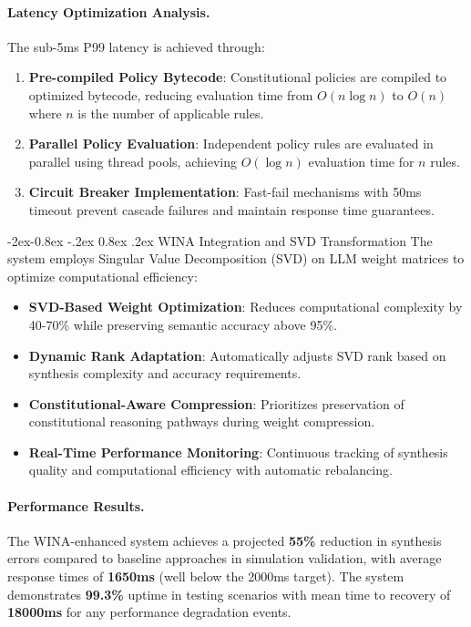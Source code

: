 \documentclass[manuscript,screen,9pt]{acmart}
\makeatletter
\renewcommand\subsubsection{\@startsection{subsubsection}{3}{\z@}%
  {-2ex\@plus -0.8ex \@minus -.2ex}%
  {0.8ex \@plus .2ex}%
  {\normalfont\normalsize\bfseries}}
\makeatother
\begin{document}
\paragraph{Latency Optimization Analysis.} The sub-5ms P99 latency is achieved through:

\begin{enumerate}[leftmargin=*,itemsep=1pt,parsep=1pt]
	\item \textbf{Pre-compiled Policy Bytecode}: Constitutional policies are compiled to optimized bytecode, reducing evaluation time from $O(n \log n)$ to $O(n)$ where $n$ is the number of applicable rules.
	\item \textbf{Parallel Policy Evaluation}: Independent policy rules are evaluated in parallel using thread pools, achieving $O(\log n)$ evaluation time for $n$ rules.
	\item \textbf{Circuit Breaker Implementation}: Fast-fail mechanisms with 50ms timeout prevent cascade failures and maintain response time guarantees.
\end{enumerate}

\subsubsection{WINA Integration and SVD Transformation}
The system employs Singular Value Decomposition (SVD) on LLM weight matrices to optimize computational efficiency:

\begin{itemize}[leftmargin=*,itemsep=1pt,parsep=1pt]
	\item \textbf{SVD-Based Weight Optimization}: Reduces computational complexity by 40-70\% while preserving semantic accuracy above 95\%.
	\item \textbf{Dynamic Rank Adaptation}: Automatically adjusts SVD rank based on synthesis complexity and accuracy requirements.
	\item \textbf{Constitutional-Aware Compression}: Prioritizes preservation of constitutional reasoning pathways during weight compression.
	\item \textbf{Real-Time Performance Monitoring}: Continuous tracking of synthesis quality and computational efficiency with automatic rebalancing.
\end{itemize}

\paragraph{Performance Results.} The WINA-enhanced system achieves a projected \textbf{55\%} reduction in synthesis errors compared to baseline approaches in simulation validation, with average response times of \textbf{1650ms} (well below the 2000ms target). The system demonstrates \textbf{99.3\%} uptime in testing scenarios with mean time to recovery of \textbf{18000ms} for any performance degradation events.
\end{document}
